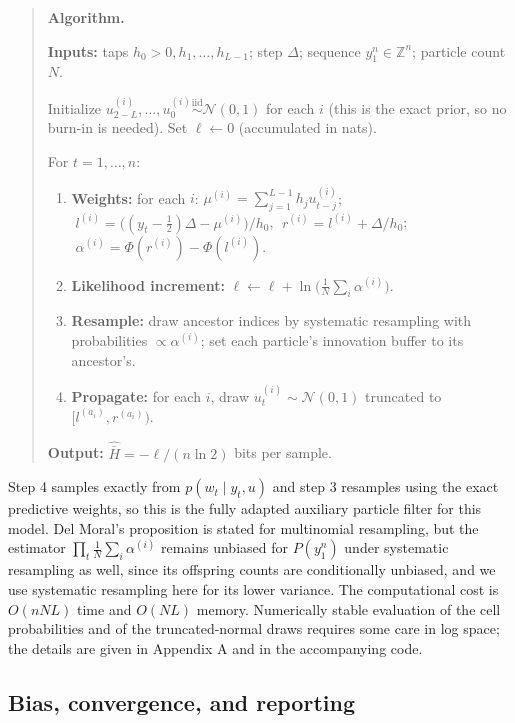 \documentclass[11pt]{article}
\providecommand{\tightlist}{%
  \setlength{\itemsep}{0pt}\setlength{\parskip}{0pt}}
\begin{document}
\begin{quote}
\textbf{Algorithm.}

\textbf{Inputs:} taps \(h_0 > 0, h_1, \dots, h_{L-1}\); step \(\Delta\); sequence \(y_1^n \in \mathbb Z^n\); particle count \(N\).

Initialize \(u^{(i)}_{2-L},\dots,u^{(i)}_0 \overset{\text{iid}}{\sim} \mathcal N(0,1)\) for each \(i\) (this is the exact prior, so no burn-in is needed). Set \(\ell \leftarrow 0\) (accumulated in nats).

For \(t = 1,\dots,n\):

\begin{enumerate}
\def\labelenumi{\arabic{enumi}.}
\tightlist
\item
  \textbf{Weights:} for each \(i\): \(\mu^{(i)} = \sum_{j=1}^{L-1} h_j u^{(i)}_{t-j}\); \(\;l^{(i)} = \big((y_t-\tfrac12)\Delta - \mu^{(i)}\big)/h_0\), \(\;r^{(i)} = l^{(i)} + \Delta/h_0\); \(\;\alpha^{(i)} = \Phi(r^{(i)}) - \Phi(l^{(i)})\).
\item
  \textbf{Likelihood increment:} \(\ell \leftarrow \ell + \ln\big(\tfrac1N\sum_i \alpha^{(i)}\big)\).
\item
  \textbf{Resample:} draw ancestor indices by systematic resampling with probabilities \(\propto \alpha^{(i)}\); set each particle's innovation buffer to its ancestor's.
\item
  \textbf{Propagate:} for each \(i\), draw \(u^{(i)}_t \sim \mathcal N(0,1)\) truncated to \([l^{(a_i)}, r^{(a_i)})\).
\end{enumerate}

\textbf{Output:} \(\hat{\bar H} = -\ell/(n\ln 2)\) bits per sample.
\end{quote}

Step 4 samples exactly from \(p(w_t \mid y_t, u)\) and step 3 resamples using the exact predictive weights, so this is the fully adapted auxiliary particle filter for this model. Del Moral's proposition \cite[Prop.~7.4.1]{DelMoral2004} is stated for multinomial resampling, but the estimator \(\prod_t \frac1N\sum_i \alpha^{(i)}\) remains unbiased for \(P(y_1^n)\) under systematic resampling as well, since its offspring counts are conditionally unbiased, and we use systematic resampling here for its lower variance. The computational cost is \(O(nNL)\) time and \(O(NL)\) memory. Numerically stable evaluation of the cell probabilities and of the truncated-normal draws requires some care in log space; the details are given in Appendix A and in the accompanying code.

\subsection{Bias, convergence, and reporting}\label{bias-convergence-and-reporting}
\end{document}
